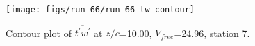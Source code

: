 \begin{figure}[H]
\centering
\texttt{[image: figs/run\_66/run\_66\_tw\_contour]}
\caption{Contour plot of $\overline{t^\prime w^\prime}$ at $z/c$=10.00, $V_{free}$=24.96, station 7.}
\end{figure}


